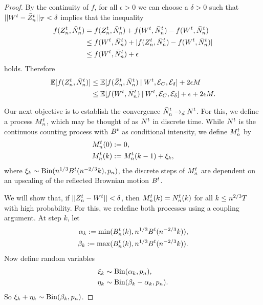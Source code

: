 \begin{proof}
By the continuity of $f$, for all $\epsilon>0$ we can choose a $\delta > 0$ such that $||W^t - \bar{Z}^t_n||_T < \delta$ implies
that the inequality
\begin{equation*}
\begin{aligned}
f(Z_n^t, \bar{N}_n^t) &= f(Z_n^t, \bar{N}_n^t) + f(W^t, \bar{N}_n^t) - f(W^t, \bar{N}_n^t) \\
&\leq f(W^t, \bar{N}_n^t) + |f(Z_n^t, \bar{N}_n^t) - f(W^t, \bar{N}_n^t)| \\
&\leq f(W^t, \bar{N}_n^t) + \epsilon
\end{aligned}
\end{equation*}
holds. Therefore
\begin{equation} \label{E: Estimation step 3}
\begin{aligned}
\mathbb{E}[f(Z_n^t, \bar{N}_n^t)] 
&\leq \mathbb{E}[f(\bar{Z}^t_n, \bar{N}_n^t) \: | \: W^t, \mathcal{E}_{C}, \mathcal{E}_{\delta}] + 2 \epsilon M \\
&\leq \mathbb{E}[f(W^t, \bar{N}_n^t) \: | \: W^t, \mathcal{E}_{C}, \mathcal{E}_{\delta}] + \epsilon + 2 \epsilon M.
\end{aligned}
\end{equation}

Our next objective is to establish the convergence $\bar{N}_n^t \rightarrow_d N^t$.
For this, we define a process $M_n^t$, which may be thought of as $N^t$ in discrete time.
While $N^t$ is the continuous counting process with $B^t$ as conditional intensity,
we define $M_n^t$ by
\begin{equation}
\begin{aligned}
M_n^t(0) &:= 0, \\
M_n^t(k) &:= M_n^t(k-1) + \xi_k, 
\end{aligned}
\end{equation}
where $\xi_k \sim \operatorname*{Bin}(n^{1 / 3}B^t(n^{-2 / 3}k), p_n)$,
the discrete steps of $M_n^t$ are dependent on an upscaling of the reflected Brownian motion $B^t$.

We will show that, if $||\bar{Z}^t_n - W^t|| < \delta$, 
then $M_n^t(k) = N_n^t(k)$ for all $k \leq n^{2 / 3}T$ with high probability.
For this, we redefine both processes using a coupling argument.
At step $k$, let
\begin{equation} \label{E: def alpha beta}
\begin{aligned}
\alpha_k := \min(B_n^t(k), n^{1 / 3}B^t(n^{-2 / 3}k)), \\
\beta_k := \max(B_n^t(k), n^{1 / 3}B^t(n^{-2 / 3}k)).
\end{aligned}
\end{equation}
Now define random variables
\begin{equation} \label{E: def xi eta}
\begin{aligned}
\xi_k &\sim \operatorname*{Bin}(\alpha_k, p_n), \\
\eta_k &\sim \operatorname*{Bin}(\beta_k - \alpha_k, p_n).
\end{aligned}
\end{equation}
So $\xi_k + \eta_k \sim \operatorname*{Bin}(\beta_k, p_n)$.


\end{proof}
